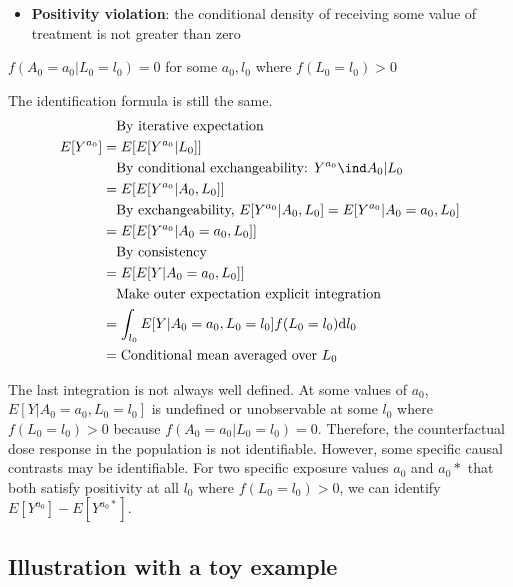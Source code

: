 \documentclass[dvipdfmx,10pt]{article}
\begin{document}
\begin{itemize}
\item \textbf{Positivity violation}: the conditional density of receiving some value of treatment is not greater than zero
\end{itemize}
\begin{center}
\(f(A_{0} = a_{0} | L_{0} = l_{0}) = 0\) for some \(a_{0},l_{0}\) where \(f(L_{0} = l_{0}) > 0\)
\end{center}

The identification formula is still the same.
\begin{align*}
  &~~~\text{By iterative expectation}\\
  E[Y^{a_{0}}]
  &= E[E[Y^{a_{0}} | L_{0}]]\\
  &~~~\text{By conditional exchangeability: } Y^{a_{0}} \ind A_{0} | L_{0}\\
  &= E[E[Y^{a_{0}} | A_{0}, L_{0}]]\\
  &~~~\text{By exchangeability, }E[Y^{a_{0}} | A_{0}, L_{0}] = E[Y^{a_{0}} | A_{0} = a_{0}, L_{0}]\\
  &= E[E[Y^{a_{0}} | A_{0} = a_{0}, L_{0}]]\\
  &~~~\text{By consistency}\\
  &= E[E[Y | A_{0} = a_{0}, L_{0}]]\\
  &~~~\text{Make outer expectation explicit integration}\\
  &= \int_{l_{0}} E[Y | A_{0} = a_{0}, L_{0} = l_{0}] f(L_{0} = l_{0}) \text{d}l_{0}\\
  &= \text{Conditional mean averaged over $L_{0}$}\\
\end{align*}

The last integration is not always well defined. At some values of \(a_{0}\), \(E[Y | A_{0} = a_{0}, L_{0} = l_{0}]\) is undefined or unobservable at some \(l_{0}\) where \(f(L_{0} = l_{0}) > 0\) because \(f(A_{0} = a_{0} | L_{0} = l_{0}) = 0\). Therefore, the counterfactual dose response in the population is not identifiable. However, some specific causal contrasts may be identifiable. For two specific exposure values \(a_{0}\) and \(a_{0}*\) that both satisfy positivity at all \(l_{0}\) where \(f(L_{0} = l_{0}) > 0\), we can identify \(E[Y^{a_{0}}] - E[Y^{a_{0}*}]\).

\subsection{Illustration with a toy example}
\label{sec:org9493d5d}
\end{document}
